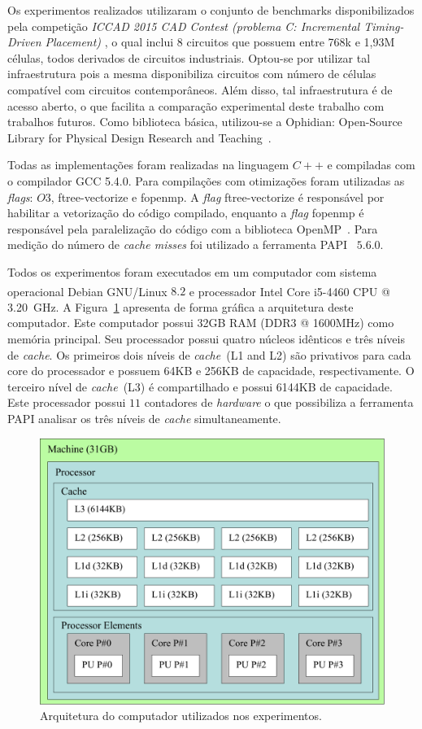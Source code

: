 Os experimentos realizados utilizaram o conjunto de benchmarks disponibilizados pela competição \textit{ICCAD 2015 CAD Contest (problema C: Incremental Timing-Driven Placement)} \cite{kim2015}, o qual inclui 8 circuitos que possuem entre 768k e 1,93M células, todos derivados de circuitos industriais. Optou-se por utilizar tal infraestrutura pois a mesma disponibiliza circuitos com número de células compatível com circuitos contemporâneos. Além disso, tal infraestrutura é de acesso aberto, o que facilita a comparação experimental deste trabalho com trabalhos futuros. Como biblioteca básica, utilizou-se a Ophidian: Open-Source Library for Physical Design Research and Teaching~\cite{ophidian}.

Todas as implementações foram realizadas na linguagem $C++$ e compiladas com o compilador GCC 5.4.0. Para compilações com otimizações foram utilizadas as \textit{flags}: $O3$, ftree-vectorize e fopenmp. A \textit{flag} ftree-vectorize é responsável por habilitar a vetorização do código compilado, enquanto a \textit{flag} fopenmp é responsável pela paralelização do código com a biblioteca OpenMP~\cite{openmp}. Para medição do número de  \textit{cache misses} foi utilizado a ferramenta PAPI~\cite{papi} $5.6.0$.

Todos os experimentos foram executados em um computador com sistema operacional Debian GNU/Linux $8.2$ e processador Intel\textsuperscript{\textregistered} Core\textsuperscript{\textregistered} i5-4460 CPU @ 3.20~GHz.
A Figura~\ref{fig:architectureMemoryZeus} apresenta de forma gráfica a arquitetura deste computador.
Este computador possui 32GB RAM (DDR3 @ 1600MHz) como memória principal.
Seu processador possui quatro núcleos idênticos e três níveis de \textit{cache}.
Os primeiros dois níveis de \textit{cache}~(L1 and L2) são privativos para cada core do processador e possuem 64KB e 256KB de capacidade, respectivamente.
O terceiro nível de \textit{cache}~(L3) é compartilhado e possui 6144KB de capacidade.
Este processador possui $11$ contadores de \textit{hardware} o que possibiliza a ferramenta PAPI analisar os três níveis de \textit{cache} simultaneamente.

\begin{figure}[ht]
    \centering
    \includegraphics[width=0.5\linewidth]{img/results/architectureMemoryZeus.pdf}
    \caption{Arquitetura do computador utilizados nos experimentos.}
    \label{fig:architectureMemoryZeus}
\end{figure}


